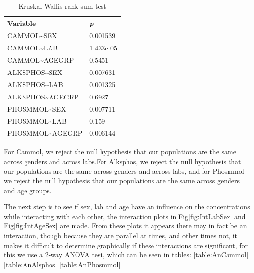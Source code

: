 \documentclass{article}
\begin{document}
    \begin{table}[H]
    \begin{center}
    \begin{tabular}{|ll|}
        \hline
        Variable & \textit{p} \\
        \hline 
        \hline
        CAMMOL\textasciitilde SEX & 0.001539 \\
        CAMMOL\textasciitilde LAB & 1.433e-05 \\
        CAMMOL\textasciitilde AGEGRP & 0.5451 \\
        \hline
        \hline 
        ALKSPHOS\textasciitilde SEX & 0.007631 \\
        ALKSPHOS\textasciitilde LAB & 0.001325 \\
        ALKSPHOS\textasciitilde AGEGRP & 0.6927 \\
        \hline
        \hline 
        PHOSMMOL\textasciitilde SEX & 0.007711 \\
        PHOSMMOL\textasciitilde LAB & 0.159 \\
        PHOSMMOL\textasciitilde AGEGRP & 0.006144 \\
        \hline
    \end{tabular}
    \caption{Kruskal-Wallis rank sum test}
    \label{table:krusk}
    \end{center}
    \end{table}
    
  For Cammol, we reject the null hypothesis that our populations are the same across genders and across labs.For Alksphos, we reject the null hypothesis that our populations are the same across genders and across labs, and for Phosmmol we reject the null hypothesis that our populations are the same across genders and age groups.

      The next step is to see if sex, lab and age have an influence on the concentrations while interacting with each other, the interaction plots in Fig\ref{fig:IntLabSex} and Fig\ref{fig:IntAgeSex} are made. From these plots it appears there may in fact be an interaction, though because they are parallel at times, and other times not, it makes it difficult to determine graphically if these interactions are significant, for this we use a 2-way ANOVA test, which can be seen in tables: \ref{table:AnCammol} \ref{table:AnAlsphos} \ref{table:AnPhosmmol}
\end{document}

